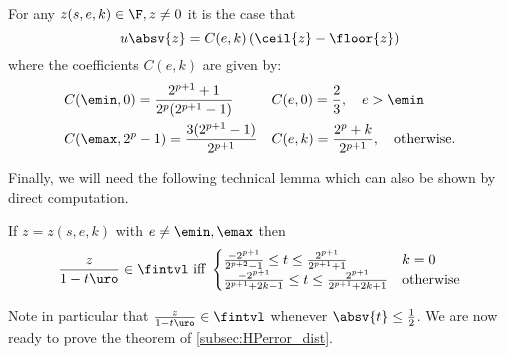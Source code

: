 \begin{lemma}\label{lem:Ccoeff}
For any $z(s,e,k)\in\F, z\neq 0$ it is the case that 
\[
u\absv{z} =  C(e,k)\left(\ceil{z}-\floor{z}\right)
\]
where the coefficients $C(e,k)$ are given by:
\begin{align*}
&C(\emin,0) = \frac{2^{p+1}+1}{2^p(2^{p+1}-1)} & & C(e,0)=\frac{2}{3},\quad e>\emin\\
&C(\emax,2^p-1)=\frac{3(2^{p+1}-1)}{2^{p+1}} & & C(e,k)=\frac{2^p+k}{2^{p+1}},\quad\text{otherwise}.
\end{align*}
\end{lemma}
\noindent Finally, we will need the following technical lemma which can also be shown by direct computation.
\begin{lemma}\label{lem:trange}
If $z=z(s,e,k)$ with $e\neq \emin,\emax$ then 
\[
\frac{z}{1-t\uro}\in\fintvl \text{ iff } 
\begin{cases}
\frac{-2^{p+1}}{2^{p+2}-1}\leq t\leq \frac{2^{p+1}}{2^{p+1}+1} & k=0\\
\frac{-2^{p+1}}{2^{p+1}+2k-1}\leq t\leq \frac{2^{p+1}}{2^{p+1}+2k+1}&\text{otherwise}
\end{cases}
\]
\end{lemma}
Note in particular that $\frac{z}{1-t\uro}\in\fintvl$ whenever $\absv{t}\leq \frac{1}{2}$. We are now ready to prove the theorem of \cref{subsec:HPerror_dist}.


